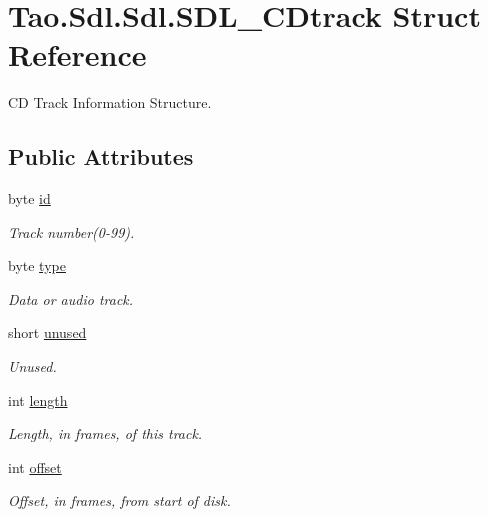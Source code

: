 \hypertarget{struct_tao_1_1_sdl_1_1_sdl_1_1_s_d_l___c_dtrack}{
\section{Tao.Sdl.Sdl.SDL\_\-CDtrack Struct Reference}
\label{struct_tao_1_1_sdl_1_1_sdl_1_1_s_d_l___c_dtrack}
}


CD Track Information Structure.  


\subsection*{Public Attributes}
\begin{DoxyCompactItemize}
\item 
byte \hyperlink{struct_tao_1_1_sdl_1_1_sdl_1_1_s_d_l___c_dtrack_a0aee57191de5fac82251bd827fcf64bf}{id}
\begin{DoxyCompactList}\small\item\em Track number(0-\/99). \item\end{DoxyCompactList}\item 
byte \hyperlink{struct_tao_1_1_sdl_1_1_sdl_1_1_s_d_l___c_dtrack_a95bceb0ab5ca32c3572ae36613e5a299}{type}
\begin{DoxyCompactList}\small\item\em Data or audio track. \item\end{DoxyCompactList}\item 
short \hyperlink{struct_tao_1_1_sdl_1_1_sdl_1_1_s_d_l___c_dtrack_aebba7b7ca29edf4232172d0b9356a5a7}{unused}
\begin{DoxyCompactList}\small\item\em Unused. \item\end{DoxyCompactList}\item 
int \hyperlink{struct_tao_1_1_sdl_1_1_sdl_1_1_s_d_l___c_dtrack_a827b339b0fbd1afa16e999bb4f8b88ef}{length}
\begin{DoxyCompactList}\small\item\em Length, in frames, of this track. \item\end{DoxyCompactList}\item 
int \hyperlink{struct_tao_1_1_sdl_1_1_sdl_1_1_s_d_l___c_dtrack_ae49a94c371c0d1626c09dc2f9a5225e4}{offset}
\begin{DoxyCompactList}\small\item\em Offset, in frames, from start of disk. \item\end{DoxyCompactList}\end{DoxyCompactItemize}


